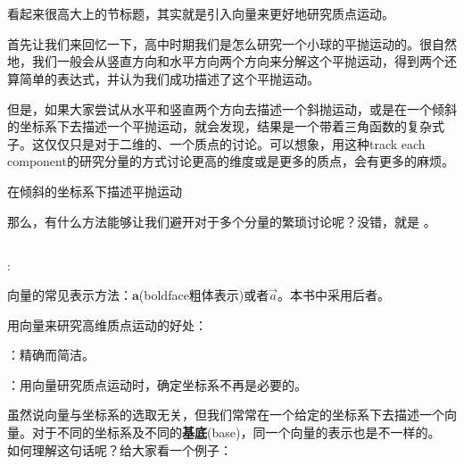 \section[高维的质点运动]{}
看起来很高大上的节标题，其实就是引入向量来更好地研究质点运动。

首先让我们来回忆一下，高中时期我们是怎么研究一个小球的平抛运动的。很自然地，我们一般会从竖直方向和水平方向两个方向来分解这个平抛运动，得到两个还算简单的表达式，并认为我们成功描述了这个平抛运动。

但是，如果大家尝试从水平和竖直两个方向去描述一个斜抛运动，或是在一个倾斜的坐标系下去描述一个平抛运动，就会发现，结果是一个带着三角函数的复杂式子。这仅仅只是对于二维的、一个质点的讨论。可以想象，用这种track each component的研究分量的方式讨论更高的维度或是更多的质点，会有更多的麻烦。
\begin{center}
    在倾斜的坐标系下描述平抛运动
\end{center}

那么，有什么方法能够让我们避开对于多个分量的繁琐讨论呢？没错，就是 。
\subsection[向量]{}
\begin{Itemize}
    \item {}: 
\end{Itemize}

向量的常见表示方法：$\mathbf{a}$(boldface粗体表示)或者$\vec{a}$。本书中采用后者。

用向量来研究高维质点运动的好处：
\begin{Itemize}
    \item {}：精确而简洁。
    \item {}：用向量研究质点运动时，确定坐标系不再是必要的。
\end{Itemize}
虽然说向量与坐标系的选取无关，但我们常常在一个给定的坐标系下去描述一个向量。对于不同的坐标系及不同的\textbf{基底}(base)，同一个向量的表示也是不一样的。
如何理解这句话呢？给大家看一个例子：

